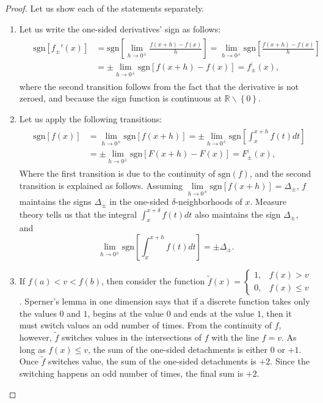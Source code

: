 \documentclass[11pt]{book}
\begin{document}
\begin{proof}Let us show each of the statements separately.
\begin{enumerate}
\item Let us write the one-sided derivatives' sign as follows: 
\begin{align}
&\begin{aligned}
\text{sgn}\left[ f_{\pm}'\left(x\right) \right] &= \text{sgn}\left[\underset{h\rightarrow0^{\pm}}{\lim}\frac{f\left(x+h\right)-f\left(x\right)}{h}\right]
=\underset{h\rightarrow0^{\pm}}{\lim}\text{sgn}\left[\frac{f\left(x+h\right)-f\left(x\right)}{h}\right] \\
&=\pm \underset{h\rightarrow0^{\pm}}{\lim}\text{sgn}\left[f\left(x+h\right)-f\left(x\right)\right]
=f_{\pm}^{;}\left(x\right),
\end{aligned}
\end{align}
where the second transition follows from the fact that the derivative is not zeroed, and because the sign function is continuous at $\mathbb{R}\backslash\left\{ 0\right\}.$
\item Let us apply the following transitions:
\begin{align}
&\begin{aligned}\text{sgn}\left[f\left(x\right)\right] &=\underset{h\rightarrow0^{\pm}}{\lim}\text{sgn}\left[f\left(x+h\right)\right]=\pm \underset{h\rightarrow0^{\pm}}{\lim}\text{sgn}\left[\int_x^{x+h}f\left(t\right)dt\right] \\ &=\pm \underset{h\rightarrow0^{\pm}}{\lim}\text{sgn}\left[F\left(x+h\right)-F\left(x\right)\right]=F_{\pm}^{;}\left(x\right),
\end{aligned}
\end{align}
Where the first transition is due to the continuity of $\text{sgn}\left(f\right)$, and the second transition is explained as follows. Assuming $\underset{h\rightarrow0^{\pm}}{\lim}\text{sgn}\left[f\left(x+h\right)\right]=\Delta_{\pm}$, $f$ maintains the signs $\Delta_{\pm}$ in the one-sided $\delta$-neighborhoods of $x$. Measure theory tells us that the integral $\int_x^{x+\delta} f\left(t\right)dt$ also maintains the sign $\Delta_{\pm}$, and $$\underset{h\rightarrow0^{\pm}}{\lim}\text{sgn}\left[\int_x^{x+h}f\left(t\right)dt\right]=\pm\Delta_{\pm}.$$
\item If $f\left(a\right)<v<f\left(b\right)$, then consider the function $\widetilde{f}\left(x\right)=\begin{cases}
1, & f\left(x\right)>v\\
0, & f\left(x\right)\leq v
\end{cases}$. Sperner's lemma in one dimension says that if a discrete function takes only the values $0$ and $1$, begins at the value $0$ and ends at the value $1$, then it must switch values an odd number of times. From the continuity of $f$, however, $\widetilde{f}$ switches values in the intersections of $f$ with the line $f=v$. As long as $f\left(x\right)\leq v$, the sum of the one-sided detachments is either $0$ or $+1$. Once $\widetilde{f}$ switches value, the sum of the one-sided detachments is $+2$. Since the switching happens an odd number of times, the final sum is $+2$.


\end{enumerate}
\end{proof}
\end{document}
